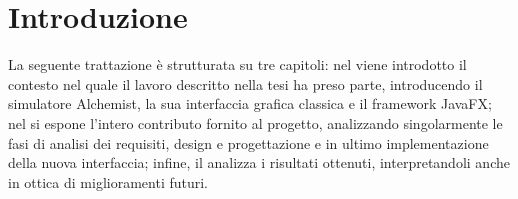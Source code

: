 

\chapter{Introduzione}\label{ch:intro}

\medskip

La seguente trattazione è strutturata su tre capitoli: nel  viene introdotto il contesto nel quale il lavoro descritto nella tesi ha preso parte, introducendo il simulatore Alchemist, la sua interfaccia grafica classica e il framework JavaFX; nel  si espone l'intero contributo fornito al progetto, analizzando singolarmente le fasi di analisi dei requisiti, design e progettazione e in ultimo implementazione della nuova interfaccia; infine, il  analizza i risultati ottenuti, interpretandoli anche in ottica di miglioramenti futuri.
